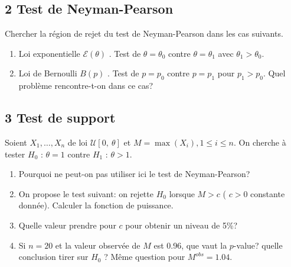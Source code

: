 \documentclass[a4paper,10pt]{article}
\begin{document}
\subsection*{2 Test de Neyman-Pearson}

Chercher la r\'{e}gion de rejet du test de Neyman-Pearson dans les cas suivants.
\begin{enumerate}
\item  Loi exponentielle $\mathcal{E}(\theta)$ . Test de $\theta=\theta_{0}$ contre $\theta=\theta_{1}$ avec $\theta_{1}>\theta_{0}.$
\item Loi de Bernoulli $B(p)$ . Test de $p=p_{0}$ contre $p=p_{1}$ pour $p_{1}>p_{0}$. Quel probl\`{e}me rencontre-t-on dans ce cas?
\end{enumerate}

\subsection*{3 Test de support}

Soient $X_{1}, \ldots, X_{n}$ de loi $\mathcal{U}[0,\ \theta]$ et $M=\displaystyle \max(X_{i}), 1\leq i\leq n$. On cherche \`{a} tester $H_{0}$ : $\theta=1$ contre $H_{1}$ : $\theta>1.$
\begin{enumerate}
\item Pourquoi ne peut-on pas utiliser ici le test de Neyman-Pearson?
\item  On propose le test suivant: on rejette $H_{0}$ lorsque $M>c$ ( $c>0$ constante donn\'{e}e). Calculer la fonction de puissance.
\item  Quelle valeur prendre pour $c$ pour obtenir un niveau de 5\%?
\item Si $n=20$ et la valeur observ\'{e}e de $M$ est 0.96, que vaut la $p$-value? quelle conclusion tirer sur $H_{0}$ ? M\^{e}me question pour $M^{obs}=1.04.$
\end{enumerate}
\end{document}
